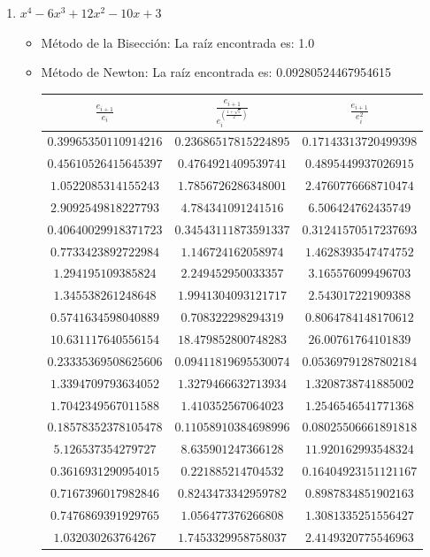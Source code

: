 \documentclass{article}
\begin{document}
\begin{enumerate}[I)]
\begin{enumerate}[(1)]
\vspace{5mm}
\item $x^4-6x^3+12x^2-10x+3$
\begin{itemize}
\item Método de la Bisección: La raíz encontrada es: 1.0
\item Método de Newton: La raíz encontrada es: 0.09280524467954615 \\
\newline
\begin{tabular}{|c|c|c|}
\hline
$\frac{e_{i+1}}{e_i}$ & $\frac{e_{i+1}}{e^{\left(\frac{1 + \sqrt{5}}{2}\right)}_i}$ & $\frac{e_{i+1}}{e^2_i}$ \\
\hline
$0.39965350110914216$ & $0.23686517815224895$ & $0.17143313720499398$\\
\hline 
$0.45610526415645397$ & $0.4764921409539741$ & $0.4895449937026915$ \\
\hline 
$1.0522085314155243$ & $1.7856726286348001$ & $2.4760776668710474$ \\
\hline 
$2.9092549818227793$ & $4.784341091241516$ & $6.506424762435749$ \\
\hline 
$0.40640029918371723$ & $0.34543111873591337$ & $0.31241570517237693$ \\
\hline 
$0.7733423892722984$ & $1.146724162058974$ & $1.4628393547474752$ \\
\hline 
$1.294195109385824$ & $2.249452950033357$ & $3.165576099496703$ \\
\hline 
$1.345538261248648$ & $1.9941304093121717$ & $2.543017221909388$ \\
\hline 
$0.5741634598040889$ & $0.708322298294319$ & $0.8064784148170612$ \\
\hline 
$10.631117640556154$ & $18.479852800748283$ & $26.00761764101839$ \\
\hline 
$0.23335369508625606$ & $0.09411819695530074$ & $0.05369791287802184$ \\
\hline 
$1.3394709793634052$ & $1.3279466632713934$ & $1.3208738741885002$ \\
\hline 
$1.7042349567011588$ & $1.410352567064023$ & $1.2546546541771368$ \\
\hline 
$0.18578352378105478$ & $0.11058910384698996$ & $0.08025506661891818$ \\
\hline 
$5.126537354279727$ & $8.635901247366128$ & $11.920162993548324$ \\
\hline 
$0.3616931290954015$ & $0.221885214704532$ & $0.16404923151121167$ \\
\hline 
$0.7167396017982846$ & $0.8243473342959782$ & $0.8987834851902163$ \\
\hline 
$0.7476869391929765$ & $1.056477376266808$ & $1.3081335251556427$ \\
\hline 
$1.032030263764267$ & $1.7453329958758037$ & $2.4149320775546963$ \\
\hline
\end{tabular}
\end{itemize}


\end{enumerate}
\end{enumerate}
\end{document}
